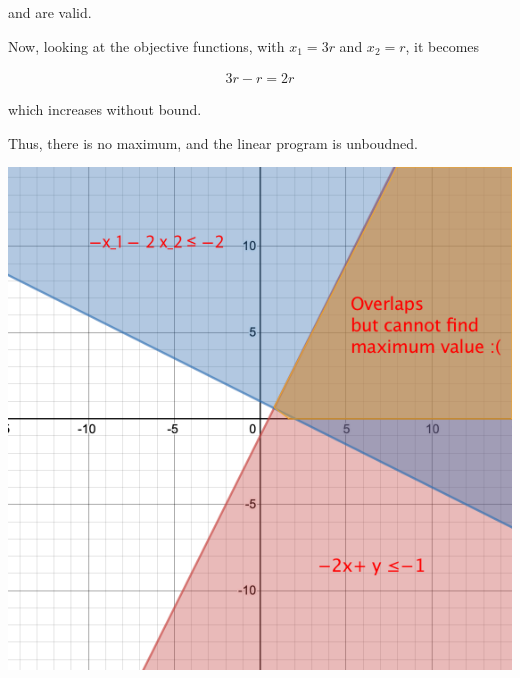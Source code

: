 \documentclass[12pt]{article}
\begin{document}
\begin{enumerate}[1.]
    and are valid.

    \bigskip

    Now, looking at the objective functions, with $x_1 = 3r$ and $x_2 = r$, it
    becomes

    \begin{align*}
        3r - r = 2r
    \end{align*}

    which increases without bound.

    \bigskip

    Thus, there is no maximum, and the linear program is unboudned.

    \bigskip

    \begin{center}
    \includegraphics[width=0.5\linewidth]{images/worksheet_6_solution_14.png}
    \end{center}










\end{enumerate}
\end{document}
